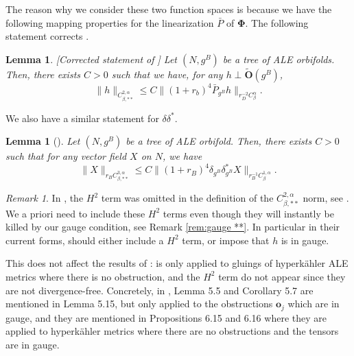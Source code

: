 \documentclass[11pt,reqno]{amsart}
\numberwithin{equation}{section}
\newtheorem{lem}[thm]{Lemma}
\theoremstyle{definition}
\theoremstyle{remark}
\newtheorem{remark}[thm]{Remark}
\begin{document}
The reason why we consider these two function spaces is because we have the following mapping properties for the linearization $\bar{P}$ of $\mathbf{\Phi}$. The following statement corrects \cite[Lemma 5.5]{ozu2}.

\begin{lem}\label{lem:inverting barP with terms at infty}[{Corrected statement of \cite[Lemma 5.5]{ozu2}}]
    Let $(N,g^B)$ be a tree of ALE orbifolds. Then, there exists $C>0$ such that we have, for any $h\perp \tilde{\mathbf{O}}(g^B)$,
    \begin{equation}
    \|h\|_{C^{2,\alpha}_{\beta,**}}\leqslant C \big\|(1+r_b)^4\bar{P}_{g^B}h\big\|_{r_D^{-2}C^{\alpha}_\beta}.\label{inverse ALE term 4}
    \end{equation}
\end{lem}

We also have a similar statement for $\delta\delta^*$.

\begin{lem}[{\cite[Lemma 5.6]{ozu2}}]\label{lem:controle inverse mise jauge ALE}
    Let $(N,g^B)$ be a tree of ALE orbifold. Then, there exists $C>0$ such that for any vector field $X$ on $N$, we have
    \begin{equation}
        \|X\|_{r_BC^{3,\alpha}_{\beta,**}}\leqslant C \big\|(1+r_B)^4\delta_{g^B}\delta_{g^B}^*X\big\|_{r_B^{-1}C^{1,\alpha}_\beta}.\label{inverse delta ALE term 4}
    \end{equation}
\end{lem}

\begin{remark}
    In \cite{ozu2}, the $H^2$ term was omitted in the definition of the $C^{2,\alpha}_{\beta,**}$ norm, see \cite[Definition 5.3]{ozu2}. We a priori need to include these $H^2$ terms even though they will instantly be killed by our gauge condition, see Remark \ref{rem:gauge **}. In particular in their current forms, \cite[Lemma 5.5 and Corollary 5.7]{ozu2} should either include a $H^2$ term, or impose that $h$ is in gauge. 
    
    This does not affect the results of \cite{ozu2}: \cite[Corollary 5.7]{ozu2} is only applied to gluings of hyperkähler ALE metrics where there is no obstruction, and the $H^2$ term do not appear since they are not divergence-free. Concretely, in \cite{ozu2}, Lemma 5.5 and Corollary 5.7 are mentioned in Lemma 5.15, but only applied to the obstructions $\mathbf{o}_j$ which are in gauge, and they are mentioned in Propositions 6.15 and 6.16 where they are applied to hyperkähler metrics where there are no obstructions and the tensors are in gauge. 
\end{remark}
\end{document}
